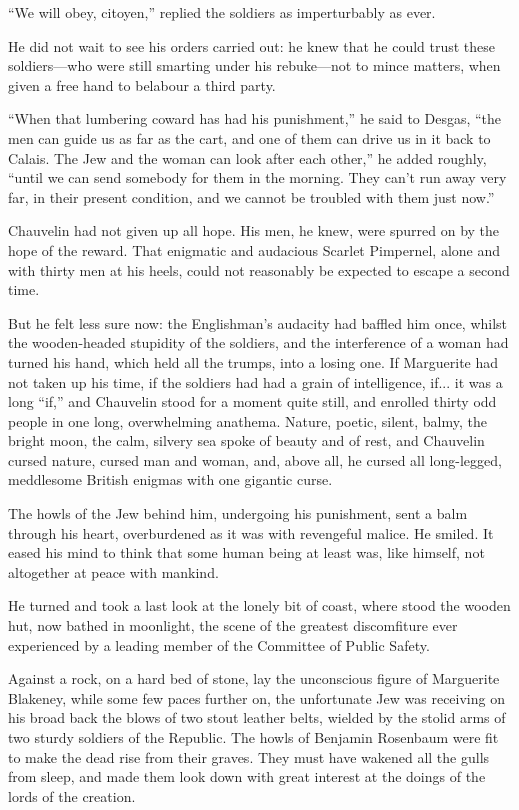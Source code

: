 \documentclass[paper=5.5in:8.5in,BCOR=7mm,twoside,DIV=calc,12pt,usegeometry,chapterprefix,endperiod,headings=big]{scrbook}
\begin{document}
\enquote{We will obey, citoyen,} replied the soldiers as imperturbably as ever.

He did not wait to see his orders carried out: he knew that he could trust these soldiers---who were still smarting under his rebuke---not to mince matters, when given a free hand to belabour a third party.

\enquote{When that lumbering coward has had his punishment,} he said to Desgas, \enquote{the men can guide us as far as the cart, and one of them can drive us in it back to Calais. The Jew and the woman can look after each other,} he added roughly, \enquote{until we can send somebody for them in the morning. They can't run away very far, in their present condition, and we cannot be troubled with them just now.}

Chauvelin had not given up all hope. His men, he knew, were spurred on by the hope of the reward. That enigmatic and audacious Scarlet Pimpernel, alone and with thirty men at his heels, could not reasonably be expected to escape a second time.

But he felt less sure now: the Englishman's audacity had baffled him once, whilst the wooden-headed stupidity of the soldiers, and the interference of a woman had turned his hand, which held all the trumps, into a losing one. If Marguerite had not taken up his time, if the soldiers had had a grain of intelligence, if... it was a long \enquote{if,} and Chauvelin stood for a moment quite still, and enrolled thirty odd people in one long, overwhelming anathema. Nature, poetic, silent, balmy, the bright moon, the calm, silvery sea spoke of beauty and of rest, and Chauvelin cursed nature, cursed man and woman, and, above all, he cursed all long-legged, meddlesome British enigmas with one gigantic curse.

The howls of the Jew behind him, undergoing his punishment, sent a balm through his heart, overburdened as it was with revengeful malice. He smiled. It eased his mind to think that some human being at least was, like himself, not altogether at peace with mankind.

He turned and took a last look at the lonely bit of coast, where stood the wooden hut, now bathed in moonlight, the scene of the greatest discomfiture ever experienced by a leading member of the Committee of Public Safety.

Against a rock, on a hard bed of stone, lay the unconscious figure of Marguerite Blakeney, while some few paces further on, the unfortunate Jew was receiving on his broad back the blows of two stout leather belts, wielded by the stolid arms of two sturdy soldiers of the Republic. The howls of Benjamin Rosenbaum were fit to make the dead rise from their graves. They must have wakened all the gulls from sleep, and made them look down with great interest at the doings of the lords of the creation.
\end{document}
